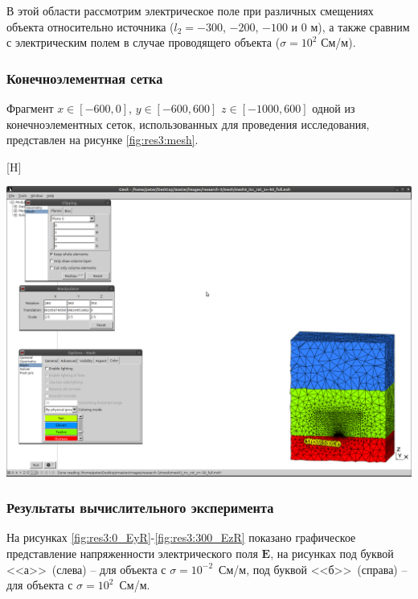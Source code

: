 \documentclass[a4paper,14pt]{article}
\makeatletter
\renewenvironment{figure}[1][\fps@figure]{
  \edef\@tempa{\noexpand\@float{figure}[#1]}
  \@tempa
  \addtocounter{foofigure}{1}
}{
  \end@float
}
\makeatother
\begin{document}
В этой области рассмотрим электрическое поле при различных смещениях объекта относительно источника ($l_2=-300$, $-200$, $-100$ и $0$ м), а также сравним с электрическим полем в случае проводящего объекта ($\sigma=10^2$ См/м).

\subsubsection{Конечноэлементная сетка}
Фрагмент $x \in [-600,0]$, $y \in [-600,600]$ $z \in [-1000,600]$ одной из конечноэлементных сеток, использованных для проведения исследования, представлен на рисунке \ref{fig:res3:mesh}.

\begin{figure}[H]
	\centering
	\includegraphics[trim=390mm 20mm 5mm 195mm,clip,scale=0.5]{research-3/mesh/mesh.png}
	\caption{фрагмент конечноэлементной сетки}
	\label{fig:res3:mesh}
\end{figure}

\subsubsection{Результаты вычислительного эксперимента}
На рисунках \ref{fig:res3:0_EyR}-\ref{fig:res3:300_EzR} показано графическое представление напряженности электрического поля $\mathbf{E}$, на рисунках под буквой <<а>>~(слева) -- для объекта с $\sigma=10^{-2}$~См/м, под буквой <<б>>~(справа) -- для объекта с $\sigma=10^{2}$~См/м.
\end{document}
